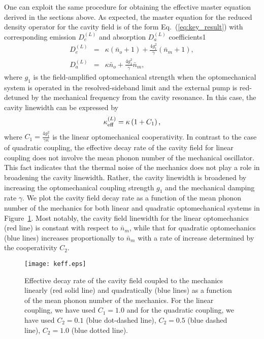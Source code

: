 \documentclass[pra,aps,showpacs,twocolumn,floatfix, superscriptaddress, nofootinbib, nobibnotes]{revtex4-1}
\begin{document}
One can exploit the same procedure for obtaining the effective master equation derived in the sections above. As expected, the master equation for the reduced density operator for the cavity field is of the form Eq.~(\ref{eq:key_result}) with corresponding emission $ D_e^{(L)}$ and absorption $ D_a^{(L)}$ coefficients1
\begin{eqnarray}
 D_e^{(L)} &=& \kappa({\bar n_o}+1) + \frac{4g_1^2}{\gamma}({\bar n_m}+1), \\
 D_a^{(L)}&=& \kappa{\bar n_o} + \frac{4g_1^2}{\gamma}{\bar n_m},
\end{eqnarray}
 where $g_1$ is the field-amplified optomechanical strength when the optomechanical system is operated in the resolved-sideband limit and the external pump is red-detuned by the mechanical frequency from the cavity resonance. In this case, the cavity linewidth can be expressed by
\begin{equation}
 \kappa_{\rm eff}^{(L)} = \kappa\left(1+C_1\right), 
\end{equation}
where $C_1=\frac{4g_1^2}{\gamma\kappa}$ is the linear optomechanical cooperativity. In contrast to the case of quadratic coupling, the effective decay rate of the cavity field for linear coupling does not involve the mean phonon number of the mechanical oscillator. This fact indicates that the thermal noise of the mechanics does not play a role in broadening the cavity linewidth. Rather, the cavity linewidth is broadened by increasing the optomechanical coupling strength $g_1$ and the mechanical damping rate $\gamma$. We plot the cavity field decay rate as a function of the mean phonon number of the mechanics for both linear and quadratic optomechanical systems in Figure~\ref{fig:keff}. Most notably, the cavity field linewidth for the linear optomechanics (red line) is constant with respect to $\bar n_{m}$, while that for quadratic optomechanics (blue lines) increases proportionally to $\bar n_{m}$ with a rate of increase determined by the cooperativity $C_{2}$.

\begin{figure}[]
\texttt{[image: keff.eps]}
\caption{Effective decay rate of the cavity field coupled to the mechanics linearly (red solid line) and quadratically (blue lines) as a function of the mean phonon number of the mechanics. 
For the linear coupling, we have used $C_1=1.0$ and for the quadratic coupling, we have used $C_2=0.1$ (blue dot-dashed line), $C_2=0.5$ (blue dashed line), $C_2=1.0$ (blue dotted line).
}
\label{fig:keff}
\end{figure}
\end{document}

